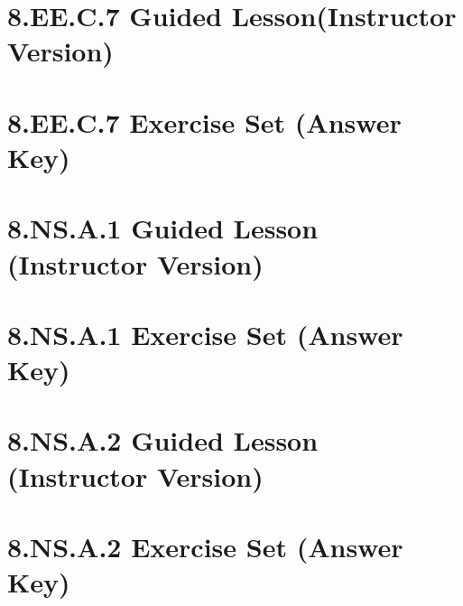 \documentclass[a4paper,12pt]{article}
\begin{document}
\newpage
\section{8.EE.C.7 Guided Lesson(Instructor Version)}


\newpage
\section{8.EE.C.7 Exercise Set (Answer Key)}


\newpage
\section{8.NS.A.1 Guided Lesson (Instructor Version)}


\newpage
\section{8.NS.A.1 Exercise Set (Answer Key)}


\newpage
\section{8.NS.A.2 Guided Lesson (Instructor Version)}


\newpage
\section{8.NS.A.2 Exercise Set (Answer Key) }

\end{document}
